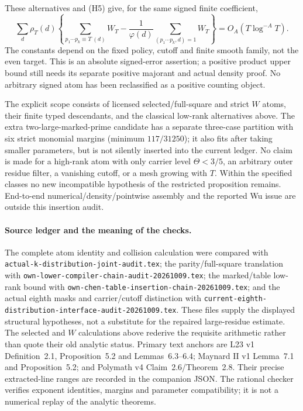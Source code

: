 These alternatives and (H5) give, for the same signed finite coefficient,
\[
 \sum_d\rho_T(d)\left\{
 \sum_{p_1\cdots p_k\equiv T\ (d)}W_T
 -\frac1{\varphi(d)}\sum_{(p_1\cdots p_k,d)=1}W_T\right\}
 =O_A(T\log^{-A}T).
\]
The constants depend on the fixed policy, cutoff and finite smooth
family, not the even target. This is an absolute signed-error assertion;
a positive product upper bound still needs its separate positive
majorant and actual density proof. No arbitrary signed atom has been
reclassified as a positive counting object.

The explicit scope consists of licensed selected/full-square and strict
$W$ atoms, their finite typed descendants, and the classical low-rank
alternatives above. The extra two-large-marked-prime candidate has a
separate three-case partition with six strict monomial margins (minimum
$117/31250$); it also fits after taking smaller parameters, but is not
silently inserted into the current ledger. No claim is made for a
high-rank atom with only carrier level $\Theta<3/5$, an arbitrary outer
residue filter, a vanishing cutoff, or a mesh growing with $T$.
Within the specified classes no new incompatible hypothesis of the
restricted proposition remains. End-to-end numerical/density/pointwise
assembly and the reported Wu issue are outside this insertion audit.

\paragraph{Source ledger and the meaning of the checks.}
The complete atom identity and collision calculation were compared with
\texttt{actual-k-distribution-joint-audit.tex}; the parity/full-square
translation with \texttt{own-lower-compiler-chain-audit-20261009.tex};
the marked/table low-rank bound with
\texttt{own-chen-table-insertion-chain-20261009.tex}; and the actual
eighth masks and carrier/cutoff distinction with
\texttt{current-eighth-distribution-interface-audit-20261009.tex}.
These files supply the displayed structural hypotheses, not a substitute
for the repaired large-residue estimate. The selected and $W$
calculations above rederive the requisite arithmetic rather than
quote their old analytic status. Primary text anchors are L23 v1
Definition~2.1, Proposition~5.2 and Lemmas~6.3--6.4; Maynard II v1
Lemma~7.1 and Proposition~5.2; and Polymath v4 Claim~2.6/Theorem~2.8.
Their precise extracted-line ranges are recorded in the companion JSON.
The rational checker verifies exponent identities, margins and parameter
compatibility; it is not a numerical replay of the analytic theorems.
